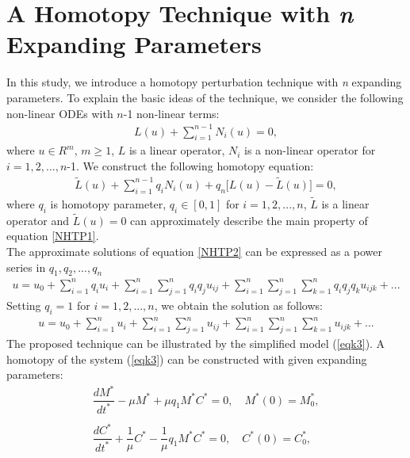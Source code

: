 \documentclass[a4paper,12pt]{article}
\begin{document}
\section{ A Homotopy Technique with \textit{n} Expanding Parameters}
In this study, we introduce a homotopy perturbation technique with \textit{n} expanding parameters. To explain the basic ideas of the technique, we consider the following non-linear ODEs with $n$-1 non-linear terms:   
\begin{equation}  
\begin{array}{llll}  
L(u)+\sum\limits_{i=1}^{n-1}N_{i}(u)=0,
\end{array}\label{NHTP1}
\end{equation}
\noindent where $u\in R^{m}$, $m\geqslant 1$, $L$ is a linear operator, $N_{i}$ is a non-linear operator for $i=1,2,...,n$-1. We construct the following homotopy equation:
\begin{equation}  
\begin{array}{llll}
\tilde{L}(u)+\sum\limits_{i=1}^{n-1}q_{i}N_{i}(u)+q_{n}\big[L(u)-\tilde{L}(u)\big]=0,
\end{array}\label{NHTP2}
\end{equation}  
\noindent where $q_{i}$ is homotopy parameter, $q_{i}\in[0,1]$ for $i=1,2,...,n$, $\tilde{L}$ is a linear operator and $\tilde{L}(u)=0$ can approximately describe the main property of equation \ref{NHTP1}.\\
\noindent The approximate solutions of equation \ref{NHTP2} can be expressed as a power series in $q_{1},q_{2},...,q_{n}$
\begin{equation}  
\begin{array}{llll}
u=u_{0}+\sum\limits_{i=1}^{n}q_{i}u_{i}+\sum\limits_{i=1}^{n}\sum\limits_{j=1}^{n}q_{i}q_{j}u_{ij}+\sum\limits_{i=1}^{n}\sum\limits_{j=1}^{n}\sum\limits_{k=1}^{n}q_{i}q_{j}q_{k}u_{ijk}+...
\end{array}\label{NHTP3}
\end{equation}  
\noindent Setting $q_{i}=1$ for $i=1,2,...,n$, we obtain the solution as follows:
\begin{equation}  
\begin{array}{llll}
u=u_{0}+\sum\limits_{i=1}^{n}u_{i}+\sum\limits_{i=1}^{n}\sum\limits_{j=1}^{n}u_{ij}+\sum\limits_{i=1}^{n}\sum\limits_{j=1}^{n}\sum\limits_{k=1}^{n}u_{ijk}+...
\end{array}\label{NHTP4}
\end{equation}
\noindent The proposed technique can be illustrated by the simplified model (\ref{eqk3}).  A homotopy of the system (\ref{eqk3}) can be constructed with given expanding parameters:
\begin{equation}
\begin{array}{llll}  
\dfrac{d M^{*}}{dt^{*}}-\mu M^{*}+\mu q_{1} M^{*} C^{*}=0  ,\quad M^{*}(0)=M^{*}_{0},\\
\\
\dfrac{d C^{*}}{dt^{*}}+\dfrac{1}{\mu} C^{*}- \dfrac{1}{\mu} q_{1} M^{*} C^{*}=0  ,\quad  C^{*}(0)=C^{*}_{0},
\end{array}
\label{eqk5} 
 \end{equation}
 
\end{document}
